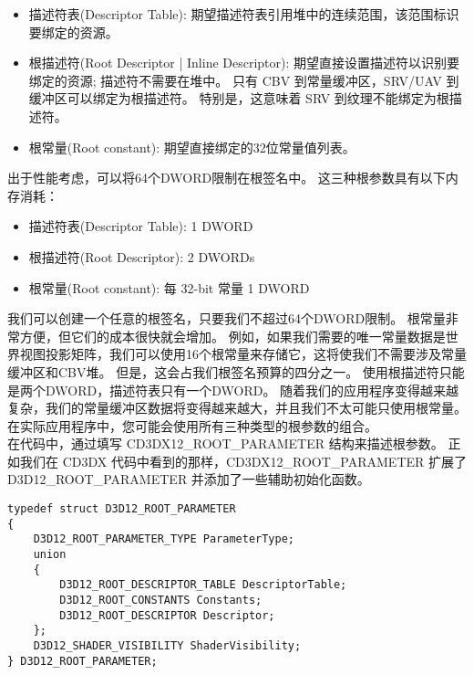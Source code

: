 \begin{itemize}
  \item 描述符表(Descriptor Table): 期望描述符表引用堆中的连续范围，该范围标识要绑定的资源。
  \item 根描述符(Root Descriptor | Inline Descriptor): 期望直接设置描述符以识别要绑定的资源; 描述符不需要在堆中。 只有 CBV 到常量缓冲区，SRV/UAV 到缓冲区可以绑定为根描述符。 特别是，这意味着 SRV 到纹理不能绑定为根描述符。
  \item 根常量(Root constant): 期望直接绑定的32位常量值列表。
\end{itemize}

\begin{flushleft}
出于性能考虑，可以将64个DWORD限制在根签名中。 这三种根参数具有以下内存消耗：\\
\end{flushleft}

\begin{itemize}
  \item 描述符表(Descriptor Table): 1 DWORD
  \item 根描述符(Root Descriptor): 2 DWORDs
  \item 根常量(Root constant): 每 32-bit 常量 1 DWORD
\end{itemize}

\begin{flushleft}
我们可以创建一个任意的根签名，只要我们不超过64个DWORD限制。 根常量非常方便，但它们的成本很快就会增加。 例如，如果我们需要的唯一常量数据是世界视图投影矩阵，我们可以使用16个根常量来存储它，这将使我们不需要涉及常量缓冲区和CBV堆。 但是，这会占我们根签名预算的四分之一。 使用根描述符只能是两个DWORD，描述符表只有一个DWORD。 随着我们的应用程序变得越来越复杂，我们的常量缓冲区数据将变得越来越大，并且我们不太可能只使用根常量。 在实际应用程序中，您可能会使用所有三种类型的根参数的组合。\\
在代码中，通过填写 CD3DX12\_ROOT\_PARAMETER 结构来描述根参数。 正如我们在 CD3DX 代码中看到的那样，CD3DX12\_ROOT\_PARAMETER 扩展了 D3D12\_ROOT\_PARAMETER 并添加了一些辅助初始化函数。\\
\end{flushleft}

\begin{lstlisting}
typedef struct D3D12_ROOT_PARAMETER
{
    D3D12_ROOT_PARAMETER_TYPE ParameterType;
    union
    {
        D3D12_ROOT_DESCRIPTOR_TABLE DescriptorTable;
        D3D12_ROOT_CONSTANTS Constants;
        D3D12_ROOT_DESCRIPTOR Descriptor;
    };
    D3D12_SHADER_VISIBILITY ShaderVisibility;
} D3D12_ROOT_PARAMETER;
\end{lstlisting}

